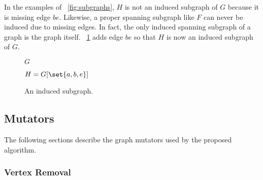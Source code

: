 In the examples of \figurename~\ref{fig:subgraphs}, \(H\) is not an induced subgraph of \(G\) because it is missing
edge \(be\).  Likewise, a proper spanning subgraph like \(F\) can never be induced due to missing edges.  In fact,
the only induced spanning subgraph of a graph is the graph itself.  \figurename~\ref{fig:induced} adds edge \(be\)
so that \(H\) is now an induced subgraph of \(G\).

\begin{figure}[H]
  \begin{minipage}{2.75in}
    \centering

    \bigskip

    \(G\)
  \end{minipage}
  \begin{minipage}{2.75in}
    \centering

    \bigskip

    \(H=G[\set{a,b,e}]\)
  \end{minipage}
  \caption{An induced subgraph.}
  \label{fig:induced}
\end{figure}

\subsection{Mutators}\label{sec:sub:mutators}

The following sections describe the graph mutators used by the proposed algorithm.

\subsubsection{Vertex Removal}\label{sec:sub:sub:vremove}


